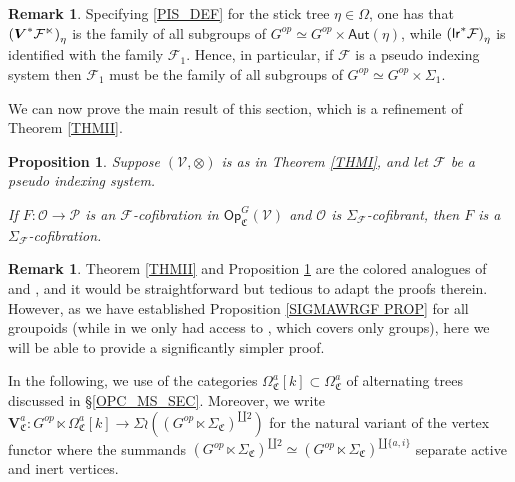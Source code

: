 \documentclass[a4paper,10pt
]{article}%
\numberwithin{equation}{section}
\numberwithin{figure}{section}
\newtheorem{proposition}[equation]{Proposition}%
\theoremstyle{definition} %
\newtheorem{remark}[equation]{Remark}%
\newcommand{\Op}{\mathsf{Op}}%
\newcommand{\F}{\ensuremath{\mathcal F}}
\newcommand{\V}{\ensuremath{\mathcal V}}
\renewcommand{\O}{\ensuremath{\mathcal O}}
\renewcommand{\P}{\ensuremath{\mathcal P}}
\newcommand{\1}{\ensuremath{\mathbbm 1}}%
\begin{document}
\begin{remark}\label{PSEUSTI REM}
	Specifying \eqref{PIS_DEF}
	for the stick tree $\eta \in \Omega$,
	one has that 
	$
	\left(\boldsymbol{V}^{\**} \mathcal{F}^{\ltimes}\right)_{\eta}
	$
	is the family of all subgroups of
	$G^{op} \simeq G^{op} \times \mathsf{\mathsf{Aut}}(\eta)$,
	while
	$
	\left(\mathsf{lr}^{\**} \mathcal{F}\right)_{\eta}
	$
	is identified with the family 
	$\F_1$.
	Hence, in particular, if $\F$ is a pseudo indexing system then
	$\F_1$ must be the family of all subgroups of
	$G^{op} \simeq G^{op} \times \Sigma_1$.
\end{remark}



We can now prove the main result of this section, which is a refinement of Theorem
\ref{THMII}.



\begin{proposition}\label{SIGMAG_COF PROP}
	Suppose $(\V, \otimes)$ is as in Theorem \ref{THMI},
	and let $\F$ be a pseudo indexing system.
	
	If $F \colon \O \to \P$ is an $\F$-cofibration in $\Op^G_{\mathfrak C}(\V)$ and $\O$ is $\Sigma_\F$-cofibrant,
	then $F$ is a $\Sigma_\F$-cofibration.
\end{proposition}

\begin{remark}\label{STRTED REM}
	Theorem \ref{THMII} and Proposition \ref{SIGMAG_COF PROP}
	are the colored analogues of 
	\cite[Lemma 6.64]{BP21} and \cite[Rem. 6.70]{BP21},
	and it would be straightforward but tedious to adapt the proofs therein.
	However, as we have established 
	Proposition \ref{SIGMAWRGF PROP} for all groupoids
	(while in \cite{BP21}
	we only had access to \cite[Prop. 6.25]{BP21},
	which covers only groups),
	here we will be able to provide a significantly simpler proof.
\end{remark}



In the following, we use of the categories
$\Omega^{a}_{\mathfrak{C}}[k] 
\subset 
\Omega^{a}_{\mathfrak{C}}$
of alternating trees discussed in \S \ref{OPC_MS_SEC}.
Moreover, we write
$\boldsymbol{V}^a_{\mathfrak{C}}
\colon G^{op} \ltimes \Omega^{a}_{\mathfrak{C}}[k] 
\to 
\Sigma \wr 
\left((G^{op} \ltimes \Sigma_{\mathfrak{C}})^{\amalg 2}\right)$ 
for the natural variant of the vertex functor 
where the summands 
$(G^{op} \ltimes \Sigma_{\mathfrak{C}})^{\amalg 2} \simeq
(G^{op} \ltimes \Sigma_{\mathfrak{C}})^{\amalg \{a,i\}}$
separate active and inert vertices.
\end{document}
